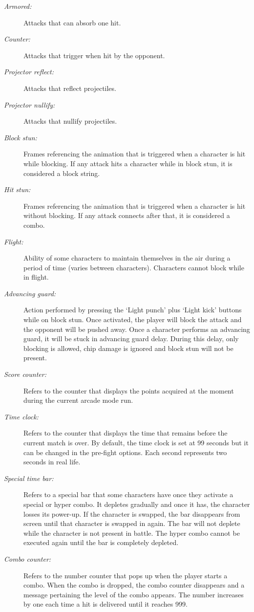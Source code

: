 \documentclass{article}
\begin{document}
\begin{flushleft}
\begin{description}
\item[\textit{Armored:}] Attacks that can absorb one hit.
\item[\textit{Counter:}] Attacks that trigger when hit by the opponent.
\item[\textit{Projector reflect:}] Attacks that reflect projectiles.
\item[\textit{Projector nullify:}] Attacks that nullify projectiles.
\item[\textit{Block stun:}] Frames referencing the animation that is triggered when a character is hit while blocking. If any attack hits a character while in block stun, it is considered a block string.
\item[\textit{Hit stun:}] Frames referencing the animation that is triggered when a character is hit without blocking. If any attack connects after that, it is considered a combo.
\item[\textit{Flight:}] Ability of some characters to maintain themselves in the air during a period of time (varies between characters). Characters cannot block while in flight.
\item[\textit{Advancing guard:}] Action performed by pressing the `Light punch' plus `Light kick' buttons while on block stun. Once activated, the player will block the attack and the opponent will be pushed away. Once a character performs an advancing guard, it will be stuck in advancing guard delay. During this delay, only blocking is allowed, chip damage is ignored and block stun will not be present.
\item[\textit{Score counter:}] Refers to the counter that displays the points acquired at the moment during the current arcade mode run.
\item[\textit{Time clock:}] Refers to the counter that displays the time that remains before the current match is over. By default, the time clock is set at 99 seconds but it can be changed in the pre-fight options. Each second represents two seconds in real life.
\item[\textit{Special time bar:}] Refers to a special bar that some characters have once they activate a special or hyper combo. It depletes gradually and once it has, the character losses its power-up. If the character is swapped, the bar disappears from screen until that character is swapped in again. The bar will not deplete while the character is not present in battle. The hyper combo cannot be executed again until the bar is completely depleted.
\item[\textit{Combo counter:}] Refers to the number counter that pops up when the player starts a combo. When the combo is dropped, the combo counter disappears and a message pertaining the level of the combo appears. The number increases by one each time a hit is delivered until it reaches 999.

\end{description}
\end{flushleft}
\end{document}
